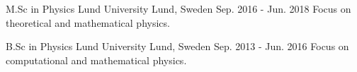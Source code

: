 


\begin{cventries}


\cventry
{M.Sc in Physics} %
{Lund University} %
{Lund, Sweden} %
{Sep. 2016 - Jun. 2018} %
{ %
  Focus on theoretical and mathematical physics.
}

\cventry
{B.Sc in Physics} %
{Lund University} %
{Lund, Sweden} %
{Sep. 2013 - Jun. 2016} %
{ %
  Focus on computational and mathematical physics.
}


\end{cventries}
